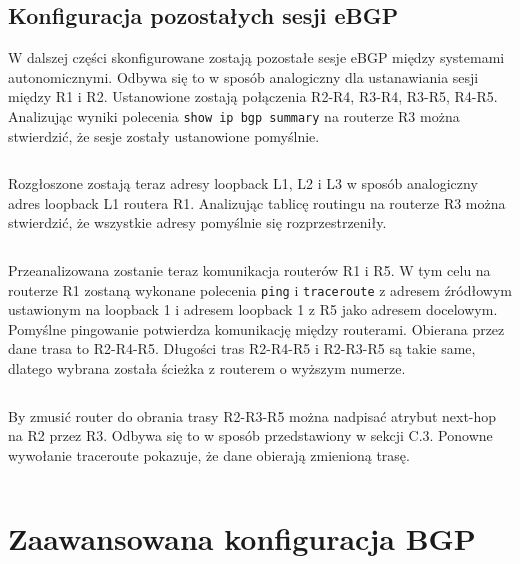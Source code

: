 \documentclass[a4paper,12pt,notitlepage]{article}
\begin{document}
\subsection{Konfiguracja pozostałych sesji eBGP}
W dalszej części skonfigurowane zostają pozostałe sesje eBGP między systemami autonomicznymi. Odbywa się to w sposób analogiczny dla ustanawiania sesji między R1 i R2. Ustanowione zostają połączenia R2-R4, R3-R4, R3-R5, R4-R5. Analizując wyniki polecenia \texttt{show ip bgp summary} na routerze R3 można stwierdzić, że sesje zostały ustanowione pomyślnie.
\inputminted[label=Rezultat polecenia show ip bgp summary na R3, firstline=806, lastline=821]{text}{Routers/R3.txt}
Rozgłoszone zostają teraz adresy loopback L1, L2 i L3 w sposób analogiczny adres loopback L1 routera R1. Analizując tablicę routingu na routerze R3 można stwierdzić, że wszystkie adresy pomyślnie się rozprzestrzeniły.
\inputminted[label=Tablica routingu na R3 po rozgłoszeniu loopbacków, firstline=891, lastline=916]{text}{Routers/R3.txt}
Przeanalizowana zostanie teraz komunikacja routerów R1 i R5. W tym celu na routerze R1 zostaną wykonane polecenia \texttt{ping} i \texttt{traceroute} z adresem źródłowym ustawionym na loopback 1 i adresem loopback 1 z R5 jako adresem docelowym. Pomyślne pingowanie potwierdza komunikację między routerami. Obierana przez dane trasa to R2-R4-R5. Długości tras R2-R4-R5 i R2-R3-R5 są takie same, dlatego wybrana została ścieżka z routerem o wyższym numerze. 
\inputminted[label=Komunikacja między R1 i R5, firstline=316, lastline=330]{text}{Routers/R1.txt}
By zmusić router do obrania trasy R2-R3-R5 można nadpisać atrybut next-hop na R2 przez R3. Odbywa się to w sposób przedstawiony w sekcji C.3. Ponowne wywołanie traceroute pokazuje, że dane obierają zmienioną trasę.
\inputminted[label=Komunikacja między R1 i R5 po zmianie next-hop, firstline=331, lastline=338]{text}{Routers/R1.txt}
\section{Zaawansowana konfiguracja BGP}
\end{document}
